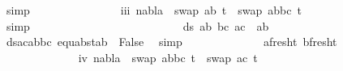 \begin{isabellebody}
\ simp\isanewline
\ \ \ \ \ \ \ \ \ \ \ \ \isamarkupfalse%
\ \isamarkupfalse%
\ iii{\isacharcolon}{\kern0pt}\ {\isachardoublequoteopen}nabla\ {\isasymturnstile}\ swap\ {\isacharbrackleft}{\kern0pt}{\isacharparenleft}{\kern0pt}a{\isacharcomma}{\kern0pt}b{\isacharparenright}{\kern0pt}{\isacharbrackright}{\kern0pt}\ t{}{\isacharprime}{\kern0pt}\ {\isasymapprox}\ swap\ {\isacharparenleft}{\kern0pt}{\isacharbrackleft}{\kern0pt}{\isacharparenleft}{\kern0pt}a{\isacharcomma}{\kern0pt}b{\isacharparenright}{\kern0pt}{\isacharcomma}{\kern0pt}{\isacharparenleft}{\kern0pt}b{\isacharcomma}{\kern0pt}c{\isacharparenright}{\kern0pt}{\isacharbrackright}{\kern0pt}{\isacharparenright}{\kern0pt}\ t{}{\isacharprime}{\kern0pt}{\isachardoublequoteclose}\isanewline
\ \ \ \ \ \ \ \ \ \ \ \ \ \ \isamarkupfalse%
\ simp\isanewline
\ \ \ \ \ \ \ \ \ \ \ \ \isanewline
\ \ \ \ \ \ \ \ \ \ \ \ \isamarkupfalse%
\ {\isachardoublequoteopen}ds\ {\isacharbrackleft}{\kern0pt}{\isacharparenleft}{\kern0pt}a{\isacharcomma}{\kern0pt}b{\isacharparenright}{\kern0pt}{\isacharcomma}{\kern0pt}\ {\isacharparenleft}{\kern0pt}b{\isacharcomma}{\kern0pt}c{\isacharparenright}{\kern0pt}{\isacharbrackright}{\kern0pt}\ {\isacharbrackleft}{\kern0pt}{\isacharparenleft}{\kern0pt}a{\isacharcomma}{\kern0pt}c{\isacharparenright}{\kern0pt}{\isacharbrackright}{\kern0pt}\ {\isacharequal}{\kern0pt}\ {\isacharbraceleft}{\kern0pt}a{\isacharcomma}{\kern0pt}b{\isacharbraceright}{\kern0pt}{\isachardoublequoteclose}\ \isanewline
\ \ \ \ \ \ \ \ \ \ \ \ \ \ \isamarkupfalse%
\ ds{\isacharunderscore}{\kern0pt}acabbc\ equ{\isacharunderscore}{\kern0pt}abst{\isacharunderscore}{\kern0pt}ab\ {}\ False\ \isamarkupfalse%
\ simp\isanewline
\ \ \ \ \ \ \ \ \ \ \ \ \isamarkupfalse%
\ a{\isacharunderscore}{\kern0pt}fresh{\isacharunderscore}{\kern0pt}t{}\ b{\isacharunderscore}{\kern0pt}fresh{\isacharunderscore}{\kern0pt}t{}\ \isanewline
\ \ \ \ \ \ \ \ \ \ \ \ \isamarkupfalse%
\ iv{\isacharcolon}{\kern0pt}\ {\isachardoublequoteopen}nabla\ {\isasymturnstile}\ swap\ {\isacharbrackleft}{\kern0pt}{\isacharparenleft}{\kern0pt}a{\isacharcomma}{\kern0pt}b{\isacharparenright}{\kern0pt}{\isacharcomma}{\kern0pt}{\isacharparenleft}{\kern0pt}b{\isacharcomma}{\kern0pt}c{\isacharparenright}{\kern0pt}{\isacharbrackright}{\kern0pt}\ t{}{\isacharprime}{\kern0pt}\ {\isasymapprox}\ swap\ {\isacharbrackleft}{\kern0pt}{\isacharparenleft}{\kern0pt}a{\isacharcomma}{\kern0pt}c{\isacharparenright}{\kern0pt}{\isacharbrackright}{\kern0pt}\ t{}{\isacharprime}{\kern0pt}{\isachardoublequoteclose}\isanewline

\end{isabellebody}
